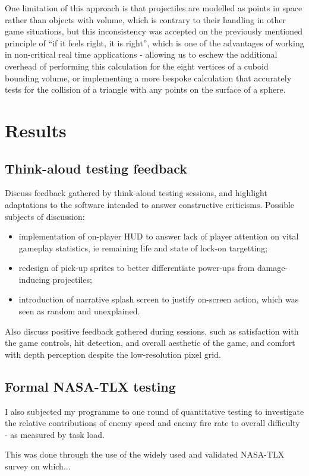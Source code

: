 \documentclass[11pt]{article}
\begin{document}
One limitation of this approach is that projectiles are modelled as points in space rather than
objects with volume, which is contrary to their handling in other game situations, but this
inconsistency was accepted on the previously mentioned principle of ``if it feels right, it is
right'', which is one of the advantages of working in non-critical real time applications -
allowing us to eschew the additional overhead of performing this calculation for the eight vertices
of a cuboid bounding volume, or implementing a more bespoke calculation that accurately tests for
the collision of a triangle with any points on the surface of a sphere.

\section{Results}
\subsection{Think-aloud testing feedback}
Discuss feedback gathered by think-aloud testing sessions, and highlight adaptations
to the software intended to answer constructive criticisms. Possible subjects of
discussion:
\begin{itemize}
   \item implementation of on-player HUD to answer lack of player attention on vital
   gameplay statistics, ie remaining life and state of lock-on targetting;
   \item redesign of pick-up sprites to better differentiate power-ups from
   damage-inducing projectiles;
   \item introduction of narrative splash screen to justify on-screen action, which
   was seen as random and unexplained.
\end{itemize}
Also discuss positive feedback gathered during sessions, such as satisfaction
with the game controls, hit detection, and overall aesthetic of the game, and comfort
with depth perception despite the low-resolution pixel grid.
\subsection{Formal NASA-TLX testing}\label{tlx}
I also subjected my programme to one round of quantitative testing to investigate the
relative contributions of enemy speed and enemy fire rate to overall difficulty - as
measured by task load.

This was done through the use of the widely used and validated NASA-TLX survey on which...
\end{document}
